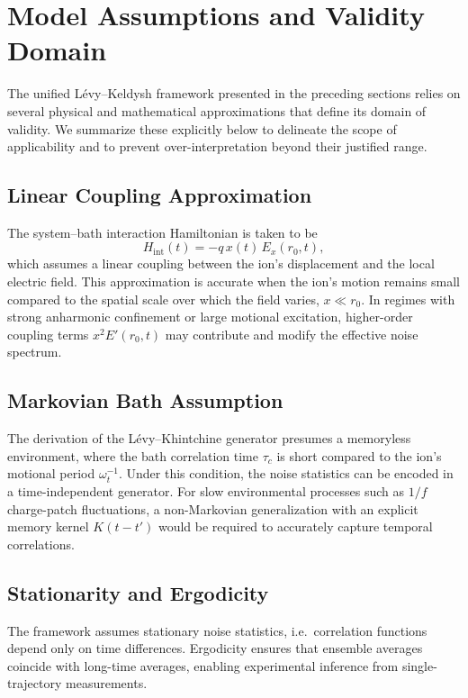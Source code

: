 \section{Model Assumptions and Validity Domain}
\label{sec:model_assumptions}

The unified L\'evy--Keldysh framework presented in the preceding sections relies on several
physical and mathematical approximations that define its domain of validity.
We summarize these explicitly below to delineate the scope of applicability
and to prevent over-interpretation beyond their justified range.

\subsection{Linear Coupling Approximation}
The system--bath interaction Hamiltonian is taken to be
\begin{equation}
H_\mathrm{int}(t) = -q\,x(t)\,E_x(r_0,t),
\end{equation}
which assumes a linear coupling between the ion's displacement and the local electric field.
This approximation is accurate when the ion's motion remains small compared to the spatial
scale over which the field varies, \(x \ll r_0\).  
In regimes with strong anharmonic confinement or large motional excitation,
higher-order coupling terms \(x^2 E'(r_0,t)\) may contribute and modify the effective noise spectrum.

\subsection{Markovian Bath Assumption}
The derivation of the L\'evy--Khintchine generator presumes a memoryless environment,
where the bath correlation time \(\tau_c\) is short compared to the ion's motional period
\(\omega_t^{-1}\).  
Under this condition, the noise statistics can be encoded in a time-independent generator.
For slow environmental processes such as \(1/f\) charge-patch fluctuations,
a non-Markovian generalization with an explicit memory kernel \(K(t-t')\)
would be required to accurately capture temporal correlations.

\subsection{Stationarity and Ergodicity}
The framework assumes stationary noise statistics,
i.e.\ correlation functions depend only on time differences.
Ergodicity ensures that ensemble averages coincide with long-time averages,
enabling experimental inference from single-trajectory measurements.

